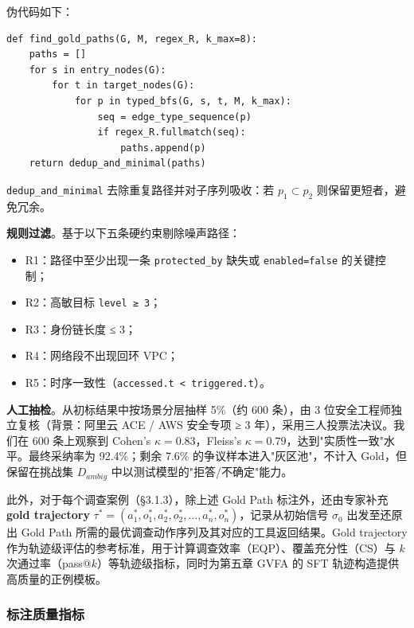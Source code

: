 \documentclass[a4paper,12pt]{ctexart}
\begin{document}
伪代码如下：

\begin{verbatim}
def find_gold_paths(G, M, regex_R, k_max=8):
    paths = []
    for s in entry_nodes(G):
        for t in target_nodes(G):
            for p in typed_bfs(G, s, t, M, k_max):
                seq = edge_type_sequence(p)
                if regex_R.fullmatch(seq):
                    paths.append(p)
    return dedup_and_minimal(paths)
\end{verbatim}

\texttt{dedup\_and\_minimal} 去除重复路径并对子序列吸收：若 $p_1 \subset p_2$ 则保留更短者，避免冗余。

\textbf{规则过滤}。基于以下五条硬约束剔除噪声路径：

\begin{itemize}[leftmargin=*]
\item R1：路径中至少出现一条 \texttt{protected\_by} 缺失或 \texttt{enabled=false} 的关键控制；
\item R2：高敏目标 \texttt{level ≥ 3}；
\item R3：身份链长度 ≤ 3；
\item R4：网络段不出现回环 VPC；
\item R5：时序一致性（\texttt{accessed.t < triggered.t}）。
\end{itemize}

\textbf{人工抽检}。从初标结果中按场景分层抽样 5\%（约 600 条），由 3 位安全工程师独立复核（背景：阿里云 ACE / AWS 安全专项 ≥ 3 年），采用三人投票法决议。我们在 600 条上观察到 Cohen's $\kappa = 0.83$，Fleiss's $\kappa = 0.79$，达到"实质性一致"水平。最终采纳率为 92.4\%；剩余 7.6\% 的争议样本进入"灰区池"，不计入 Gold，但保留在挑战集 $D_{ambig}$ 中以测试模型的"拒答/不确定"能力。

此外，对于每个调查案例（§3.1.3），除上述 Gold Path 标注外，还由专家补充 \textbf{gold trajectory} $\tau^*=(a_1^*, o_1^*, a_2^*, o_2^*, \ldots, a_n^*, o_n^*)$，记录从初始信号 $\sigma_0$ 出发至还原出 Gold Path 所需的最优调查动作序列及其对应的工具返回结果。Gold trajectory 作为轨迹级评估的参考标准，用于计算调查效率（EQP）、覆盖充分性（CS）与 $k$ 次通过率（pass@$k$）等轨迹级指标，同时为第五章 GVFA 的 SFT 轨迹构造提供高质量的正例模板。

\subsubsection{标注质量指标}
\end{document}

